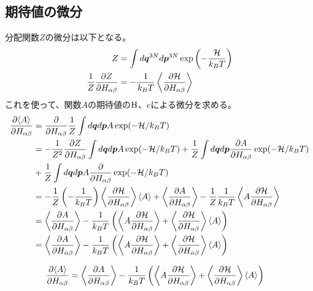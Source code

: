 \documentclass[11pt,a4paper,uplatex]{jsarticle}
\begin{document}
\subsection{期待値の微分}
分配関数$Z$の微分は以下となる。
\begin{align}
Z &= \int d\bm{q}^{3N} d\bm{p}^{3N} \exp\left(-\frac{{\cal H}}{k_{B}T}\right) \\
\frac{1}{Z}\frac{\partial Z}{\partial H_{\alpha \beta}} &= -\frac{1}{k_{B}T} \left< \frac{\partial {\cal H}}{\partial H_{\alpha \beta}}\right>
\end{align}
これを使って、関数$A$の期待値の${\rm H}$、$e$による微分を求める。
\begin{align}
    \frac{\partial \langle A \rangle }{\partial H_{\alpha \beta}} &= \frac{\partial}{\partial H_{\alpha \beta}}\frac{1}{Z} \int d\bm{q} d\bm{p} A \exp(-{\cal H}/k_{B} T) \\
    &= -\frac{1}{Z^{2}} \frac{\partial Z}{\partial H_{\alpha \beta}} \int d\bm{q} d\bm{p} A \exp(-{\cal H}/k_{B} T)  
    + \frac{1}{Z}\int d\bm{q} d\bm{p} \frac{\partial A}{\partial H_{\alpha \beta}} \exp(-{\cal H}/k_{B} T) \\ 
    &+ \frac{1}{Z}\int d\bm{q} d\bm{p} A \frac{\partial }{\partial H_{\alpha \beta}} \exp(-{\cal H}/k_{B} T) \\
    &= -\frac{1}{Z}\left(-\frac{1}{k_{B}T}\right) \left< {\frac{\partial \cal  H}{\partial H_{\alpha \beta}}}\right> \left< A \right> +\left< \frac{\partial A}{\partial H_{\alpha \beta}}  \right> - \frac{1}{Z}\frac{1}{k_{B} T} \left< A \frac{\partial {\cal H}}{\partial H_{\alpha \beta}} \right> \\
    &=\left< \frac{\partial A}{\partial H_{\alpha \beta}}  \right> -\frac{1}{k_{B}T} \left(\left< A \frac{\partial {\cal H}}{\partial H_{\alpha \beta}} \right>  + \left< \frac{\partial {\cal H}}{\partial H_{\alpha \beta}}\right> \left< A \right> \right) \\
    &= \left< \frac{\partial A}{\partial H_{\alpha \beta}}  \right> -\frac{1}{k_{B}T} \left(\left< A \frac{\partial {\cal H}}{\partial H_{\alpha \beta}} \right>  + \left< \frac{\partial {\cal H}}{\partial H_{\alpha \beta}}\right> \left< A \right> \right)
\end{align}

\begin{align}
    \frac{\partial \langle A \rangle }{\partial H_{\alpha \beta}} &= \left< \frac{\partial A}{\partial H_{\alpha \beta}}  \right> -\frac{1}{k_{B}T} \left(\left< A \frac{\partial {\cal H}}{\partial H_{\alpha \beta}} \right>  + \left< \frac{\partial {\cal H}}{\partial H_{\alpha \beta}}\right> \left< A \right> \right)
\end{align}
\end{document}
